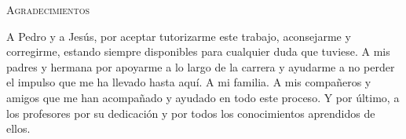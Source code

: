 \thispagestyle{empty}



\noindent\textsc{Agradecimientos}\\\bigskip

\noindent A Pedro y a Jesús, por aceptar tutorizarme este trabajo, aconsejarme y corregirme, estando siempre disponibles para cualquier duda que tuviese. A mis padres y hermana por apoyarme a lo largo de la carrera y ayudarme a no perder el impulso que me ha llevado hasta aquí. A mi familia. A mis compañeros y amigos que me han acompañado y ayudado en todo este proceso. Y por último, a los profesores por su dedicación y por todos los conocimientos aprendidos de ellos.

\cleardoublepage
\endinput
